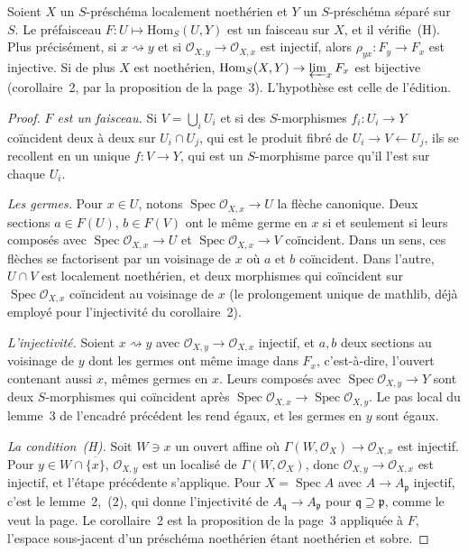 \begin{encadre}
\begin{theoreme*}
Soient $X$ un $S$-préschéma localement noethérien et $Y$ un $S$-préschéma séparé sur $S$. Le préfaisceau $F : U \mapsto \mathrm{Hom}_S(U, Y)$ est un faisceau sur $X$, et il vérifie~(H). Plus précisément, si $x \rightsquigarrow y$ et si $\mathcal O_{X,y} \to \mathcal O_{X,x}$ est injectif, alors $\rho_{yx} : F_y \to F_x$ est injective. Si de plus $X$ est noethérien, $\mathrm{Hom}_S(X, Y) \to \varprojlim_x F_x$ est bijective (corollaire~2, par la proposition de la page~3). L'hypothèse  est celle de l'édition.
\end{theoreme*}
\end{encadre}

\begin{proof}
\emph{$F$ est un faisceau.} Si $V = \bigcup_i U_i$ et si des $S$-morphismes $f_i : U_i \to Y$ coïncident deux à deux sur $U_i \cap U_j$, qui est le produit fibré de $U_i \to V \leftarrow U_j$, ils se recollent en un unique $f : V \to Y$, qui est un $S$-morphisme parce qu'il l'est sur chaque $U_i$.

\emph{Les germes.} Pour $x \in U$, notons $\operatorname{Spec} \mathcal O_{X,x} \to U$ la flèche canonique. Deux sections $a \in F(U)$, $b \in F(V)$ ont le même germe en $x$ si et seulement si leurs composés avec $\operatorname{Spec} \mathcal O_{X,x} \to U$ et $\operatorname{Spec} \mathcal O_{X,x} \to V$ coïncident. Dans un sens, ces flèches se factorisent par un voisinage de $x$ où $a$ et $b$ coïncident. Dans l'autre, $U \cap V$ est localement noethérien, et deux morphismes qui coïncident sur $\operatorname{Spec} \mathcal O_{X,x}$ coïncident au voisinage de $x$ (le prolongement unique de mathlib, déjà employé pour l'injectivité du corollaire~2).

\emph{L'injectivité.} Soient $x \rightsquigarrow y$ avec $\mathcal O_{X,y} \to \mathcal O_{X,x}$ injectif, et $a, b$ deux sections au voisinage de $y$ dont les germes ont même image dans $F_x$, c'est-à-dire, l'ouvert contenant aussi $x$, mêmes germes en $x$. Leurs composés avec $\operatorname{Spec} \mathcal O_{X,y} \to Y$ sont deux $S$-morphismes qui coïncident après $\operatorname{Spec} \mathcal O_{X,x} \to \operatorname{Spec} \mathcal O_{X,y}$. Le pas local du lemme~3 de l'encadré précédent les rend égaux, et les germes en $y$ sont égaux.

\emph{La condition~(H).} Soit $W \ni x$ un ouvert affine où $\Gamma(W, \mathcal O_X) \to \mathcal O_{X,x}$ est injectif. Pour $y \in W \cap \overline{\{x\}}$, $\mathcal O_{X,y}$ est un localisé de $\Gamma(W, \mathcal O_X)$, donc $\mathcal O_{X,y} \to \mathcal O_{X,x}$ est injectif, et l'étape précédente s'applique. Pour $X = \operatorname{Spec} A$ avec $A \to A_{\mathfrak p}$ injectif, c'est le lemme~2,~(2), qui donne l'injectivité de $A_{\mathfrak q} \to A_{\mathfrak p}$ pour $\mathfrak q \supseteq \mathfrak p$, comme le veut la page. Le corollaire~2 est la proposition de la page~3 appliquée à $F$, l'espace sous-jacent d'un préschéma noethérien étant noethérien et sobre.
\end{proof}


